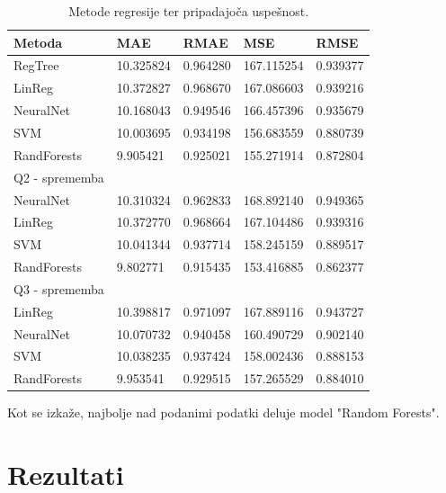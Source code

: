 \documentclass[a4paper,11pt]{article}
\begin{document}
\begin{table}[H]
\caption{Metode regresije ter pripadajoča uspešnost.}
\label{tab1}
\begin{center}
\begin{tabular}{llllp{3cm}}
\hline
Metoda & MAE & RMAE & MSE & RMSE\\
\hline
RegTree & 10.325824 & 0.964280 & 167.115254 & 0.939377 \\
LinReg & 10.372827 & 0.968670 & 167.086603 & 0.939216 \\
NeuralNet & 10.168043 & 0.949546 & 166.457396 & 0.935679 \\
SVM & 10.003695 & 0.934198 & 156.683559 & 0.880739 \\
RandForests & 9.905421 & 0.925021 & 155.271914 & 0.872804 \\
\hline
Q2	- sprememba \\
\hline
NeuralNet & 10.310324 & 0.962833 & 168.892140 & 0.949365 \\
LinReg & 10.372770 & 0.968664 & 167.104486 & 0.939316 \\
SVM & 10.041344 & 0.937714 & 158.245159 & 0.889517 \\
RandForests & 9.802771 & 0.915435 & 153.416885 & 0.862377 \\
\hline
Q3	- sprememba \\
\hline
LinReg & 10.398817 & 0.971097 & 167.889116 & 0.943727 \\
NeuralNet & 10.070732 & 0.940458 & 160.490729 & 0.902140 \\
SVM & 10.038235 & 0.937424 & 158.002436 & 0.888153 \\
RandForests & 9.953541 & 0.929515 & 157.265529 & 0.884010 \\
\hline
\end{tabular}
\end{center}
\end{table}

Kot se izkaže, najbolje nad podanimi podatki deluje model "Random 
Forests". 


\section{Rezultati}
\end{document}
